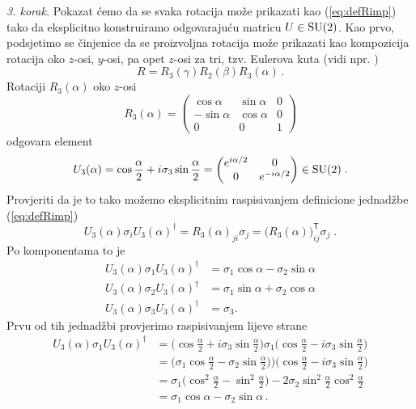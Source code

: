 \emph{3. korak.} 
Pokazat ćemo da se svaka rotacija može prikazati kao (\ref{eq:defRimp}) 
tako da eksplicitno konstruiramo odgovarajuću matricu $U \in \mathrm{SU}(2)$.
Kao prvo, podsjetimo se činjenice da se proizvoljna rotacija može prikazati
kao kompozicija rotacija oko $z$-osi, $y$-osi, pa opet $z$-osi za tri,
tzv. Eulerova kuta (vidi npr. \cite{Sakurai:2011}) 
\begin{equation}
R = R_{3}(\gamma) R_{2}(\beta) R_{3}(\alpha) \,.
\end{equation}
Rotaciji $R_{3}(\alpha)$  oko $z$-osi
\begin{equation}
   R_{3}(\alpha) = 
   \begin{pmatrix}
       \cos\alpha & \sin\alpha & 0 \\
      -\sin\alpha & \cos\alpha & 0 \\
       0 & 0 & 1
   \end{pmatrix}
\end{equation}
odgovara element
\begin{equation}
    U_{3}(\alpha) =   \cos\frac{\alpha}{2} + i \sigma_{3} \sin\frac{\alpha}{2} =
    \begin{pmatrix}
        e^{i\alpha/2} & 0 \\
        0 & e^{-i\alpha/2}
    \end{pmatrix} \in \mathrm{SU}(2) \;.
\end{equation}
Provjeriti da je to tako možemo eksplicitnim raspisivanjem definicione
jednadžbe (\ref{eq:defRimp}) 
\begin{equation}
    U_{3}(\alpha) \sigma_i U_{3}(\alpha)^\dagger =
    R_{3}(\alpha)_{ji} \sigma_{j} = \big(R_{3}(\alpha)\big)^{\mathsf{T}}_{ij} \sigma_j \;.
\end{equation}
Po komponentama to je
\begin{align}
    U_{3}(\alpha) \sigma_1 U_{3}(\alpha)^\dagger& = \sigma_1 \cos\alpha - \sigma_2 \sin\alpha \\
    U_{3}(\alpha) \sigma_2 U_{3}(\alpha)^\dagger& = \sigma_1 \sin\alpha + \sigma_2 \cos\alpha \\
    U_{3}(\alpha) \sigma_3 U_{3}(\alpha)^\dagger& = \sigma_3
.\end{align}
Prvu od tih jednadžbi provjerimo raspisivanjem lijeve strane
\begin{align}
    U_{3}(\alpha) \sigma_1 U_{3}(\alpha)^\dagger & =
    \big(\cos\frac{\alpha}{2} + i \sigma_{3} \sin\frac{\alpha}{2}\big) \sigma_1
    \big(\cos\frac{\alpha}{2} - i \sigma_{3} \sin\frac{\alpha}{2}\big) \\
& =   \big(\sigma_1 \cos\frac{\alpha}{2} - \sigma_{2} \sin\frac{\alpha}{2})\big)
    \big(\cos\frac{\alpha}{2} - i \sigma_{3} \sin\frac{\alpha}{2}\big) \\
& =   \sigma_1 \big(\cos^{2}\frac{\alpha}{2} -  \sin^{2}\frac{\alpha}{2}\big)
  -   2 \sigma_2 \sin^{2}\frac{\alpha}{2}\cos^{2}\frac{\alpha}{2} \\
& =   \sigma_1 \cos\alpha -  \sigma_2 \sin\alpha \,.
\end{align}
